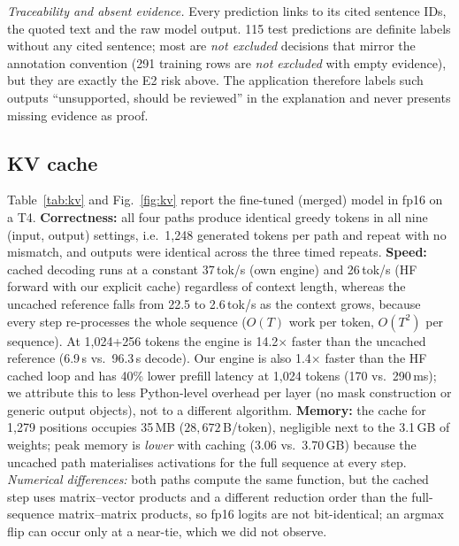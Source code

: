 \documentclass[conference]{IEEEtran}
\begin{document}
\emph{Traceability and absent evidence.} Every prediction links to its cited sentence IDs, the quoted text and the raw model output. 115 test predictions are definite labels without any cited sentence; most are \emph{not excluded} decisions that mirror the annotation convention (291 training rows are \emph{not excluded} with empty evidence), but they are exactly the E2 risk above. The application therefore labels such outputs ``unsupported, should be reviewed'' in the explanation and never presents missing evidence as proof.

\subsection{KV cache}
Table~\ref{tab:kv} and Fig.~\ref{fig:kv} report the fine-tuned (merged) model in fp16 on a T4. \textbf{Correctness:} all four paths produce identical greedy tokens in all nine (input, output) settings, i.e.\ 1{,}248 generated tokens per path and repeat with no mismatch, and outputs were identical across the three timed repeats. \textbf{Speed:} cached decoding runs at a constant 37\,tok/s (own engine) and 26\,tok/s (HF forward with our explicit cache) regardless of context length, whereas the uncached reference falls from 22.5 to 2.6\,tok/s as the context grows, because every step re-processes the whole sequence ($O(T)$ work per token, $O(T^2)$ per sequence). At 1{,}024+256 tokens the engine is 14.2$\times$ faster than the uncached reference (6.9\,s vs.\ 96.3\,s decode). Our engine is also 1.4$\times$ faster than the HF cached loop and has 40\% lower prefill latency at 1{,}024 tokens (170 vs.\ 290\,ms); we attribute this to less Python-level overhead per layer (no mask construction or generic output objects), not to a different algorithm. \textbf{Memory:} the cache for 1{,}279 positions occupies 35\,MB ($28{,}672$\,B/token), negligible next to the 3.1\,GB of weights; peak memory is \emph{lower} with caching (3.06 vs.\ 3.70\,GB) because the uncached path materialises activations for the full sequence at every step. \emph{Numerical differences:} both paths compute the same function, but the cached step uses matrix--vector products and a different reduction order than the full-sequence matrix--matrix products, so fp16 logits are not bit-identical; an argmax flip can occur only at a near-tie, which we did not observe.
\end{document}
